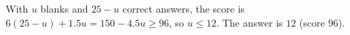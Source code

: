 With $u$ blanks and $25-u$ correct answers, the score is $6(25-u)+1.5u=150-4.5u\ge96$, so $u\le12$. The answer is $\boxed{12}$ (score $96$).
